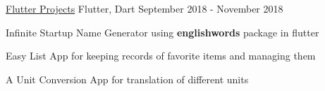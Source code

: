 \begin{cventries}
    

  \projects
    {} %
    {\href{https://github.com/parthgoyal123/Flutter-Projects}{Flutter Projects}} %
    {Flutter, Dart} %
    {September 2018 - November 2018} %
    {
      \begin{cvitems} %
        \item {Infinite Startup Name Generator using \textbf{englishwords} package in flutter}
        \item {Easy List App for keeping records of favorite items and managing them}
        \item {A Unit Conversion App for translation of different units}
      \end{cvitems}
    }

 


  


 


\end{cventries}
